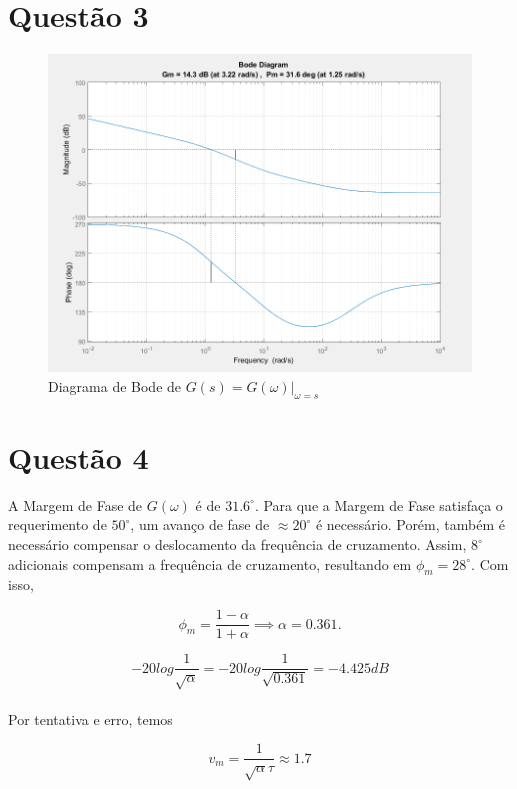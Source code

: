 \documentclass{article}
\begin{document}
\section*{Questão 3}
    \begin{figure}[H]
       \centering
            \includegraphics[width=1\linewidth]{images/bodeG.png}
            \caption{Diagrama de Bode de $ G(s) = G(\omega)|_{\omega=s} $}
            \label{fig:bodeG}
    \end{figure}

\section*{Questão 4}
    {A Margem de Fase de $G (\omega) $ é de $ 31.6 ^{\circ} $. Para que a Margem de Fase satisfaça o requerimento de $ 50 ^{\circ} $, um avanço de fase de $ \approx 20 ^{\circ} $ é necessário. Porém, também é necessário compensar o deslocamento da frequência de cruzamento. Assim, $ 8 ^{\circ} $ adicionais compensam a frequência de cruzamento, resultando em $ \phi_m = 28 ^{\circ} $. Com isso,}

    $$ \phi_m = \frac{ 1-\alpha }{ 1+\alpha } \implies \alpha = 0.361. $$

    $$ -20 log\frac{ 1 }{ \sqrt{\alpha} } = -20 log \frac{ 1 }{ \sqrt{ 0.361 } } = -4.425 dB $$\\[0.05cm]

    {Por tentativa e erro, temos}

    $$ v_{m} = \frac{1}{ \sqrt{\alpha}\tau } \approx 1.7 $$\\[0.05cm]
\end{document}
